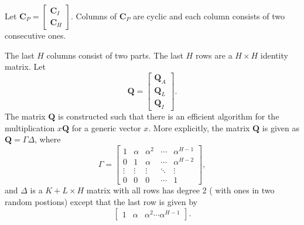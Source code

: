 \documentclass{report}
\newcommand{\ldpcnum}{L}
\newcommand{\hdpcnum}{H}
\begin{document}
Let $\mathbf{C}_P = \begin{bmatrix}\mathbf{C}_I \\
  \mathbf{C}_H \end{bmatrix}$. Columns of $\mathbf{C}_P$ are cyclic
and each column consists of two consecutive ones.


The last $\hdpcnum$ columns consist of two parts. The last $\hdpcnum$ rows are a
$\hdpcnum\times \hdpcnum$ identity matrix. 
Let
 $$\mathbf{Q} = \begin{bmatrix}\mathbf{Q}_A \\ \mathbf{Q}_L \\
   \mathbf{Q}_I\end{bmatrix}.$$
The matrix $\mathbf{Q}$ is
constructed such that there is an efficient algorithm for the
multiplication $x\mathbf{Q}$ for a generic vector $x$. More explicitly, the
matrix $\mathbf{Q}$ is given as $\mathbf{Q} = \Gamma \Delta$, where
\begin{equation*}
 \Gamma =
 \begin{bmatrix}
   1 & \alpha & \alpha^2 & \cdots & \alpha^{\hdpcnum-1} \\
   0  & 1 & \alpha & \cdots & \alpha^{\hdpcnum-2} \\
   \vdots & \vdots & \vdots & \ddots & \vdots \\
   0  & 0 & 0 & \cdots &  1
 \end{bmatrix},
\end{equation*}
and $\Delta$ is a $K+\ldpcnum{} \times \hdpcnum$ matrix with all rows has degree 2 (
with ones in two random postions) except that the last row is given by
\begin{equation*}
 \begin{bmatrix}
   1 & \alpha & \alpha^2 \cdots \alpha^{\hdpcnum-1}
 \end{bmatrix}.
\end{equation*}

    
\end{document}
